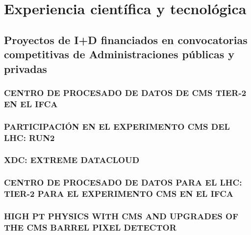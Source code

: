\documentclass[a4paper, 11pt, twoside, openright]{report}
\begin{document}
\chapter{Experiencia científica y tecnológica}

\section{Proyectos de I+D financiados en convocatorias competitivas de Administraciones públicas y privadas}


\subsection{CENTRO DE PROCESADO DE DATOS DE CMS TIER-2 EN EL IFCA}


\subsection{PARTICIPACIÓN EN EL EXPERIMENTO CMS DEL LHC: RUN2}


\subsection{XDC: EXTREME DATACLOUD}


\subsection{CENTRO DE PROCESADO DE DATOS PARA EL LHC: TIER-2 PARA EL EXPERIMENTO CMS EN EL IFCA}


\subsection{HIGH PT PHYSICS WITH CMS AND UPGRADES OF THE CMS BARREL PIXEL DETECTOR}

\end{document}
